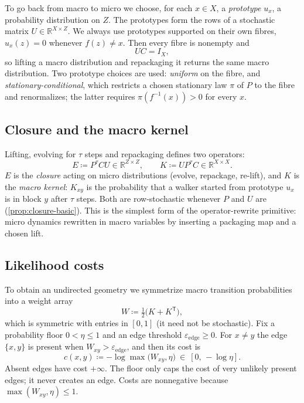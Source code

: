 \documentclass[11pt]{article}
\newcommand{\R}{\mathbb{R}}
\begin{document}
To go back from macro to micro we choose, for each $x\in X$, a \emph{prototype} $u_x$, a probability distribution on $Z$.
The prototypes form the rows of a stochastic matrix $U\in\R^{X\times Z}$.
We always use prototypes supported on their own fibres, $u_x(z)=0$ whenever $f(z)\neq x$.
Then every fibre is nonempty and
\begin{equation}
UC=I_X,
\label{eq:UC}
\end{equation}
so lifting a macro distribution and repackaging it returns the same macro distribution.
Two prototype choices are used: \emph{uniform} on the fibre, and \emph{stationary-conditional}, which restricts a chosen stationary law $\pi$ of $P$ to the fibre and renormalizes; the latter requires $\pi(f^{-1}(x))>0$ for every $x$.

\subsection{Closure and the macro kernel}

Lifting, evolving for $\tau$ steps and repackaging defines two operators:
\begin{equation}
E \coloneqq P^{\tau}CU \in\R^{Z\times Z},
\qquad
K \coloneqq UP^{\tau}C \in\R^{X\times X}.
\label{eq:closure-macro}
\end{equation}
$E$ is the \emph{closure} acting on micro distributions (evolve, repackage, re-lift), and $K$ is the \emph{macro kernel}: $K_{xy}$ is the probability that a walker started from prototype $u_x$ is in block $y$ after $\tau$ steps.
Both are row-stochastic whenever $P$ and $U$ are (\cref{prop:closure-basic}).
This is the simplest form of the operator-rewrite primitive: micro dynamics rewritten in macro variables by inserting a packaging map and a chosen lift.

\subsection{Likelihood costs}
\label{sec:costs}

To obtain an undirected geometry we symmetrize macro transition probabilities into a weight array
\begin{equation}
W\coloneqq \tfrac12\bigl(K+K^{\mathsf T}\bigr),
\end{equation}
which is symmetric with entries in $[0,1]$ (it need not be stochastic).
Fix a probability floor $0<\eta\le 1$ and an edge threshold $\varepsilon_{\mathrm{edge}}\ge 0$.
For $x\neq y$ the edge $\{x,y\}$ is present when $W_{xy}>\varepsilon_{\mathrm{edge}}$, and then its cost is
\begin{equation}
c(x,y)\coloneqq -\log\max\bigl(W_{xy},\eta\bigr)\ \in\ [0,\,-\log\eta].
\label{eq:cost}
\end{equation}
Absent edges have cost $+\infty$.
The floor only caps the cost of very unlikely present edges; it never creates an edge.
Costs are nonnegative because $\max(W_{xy},\eta)\le 1$.
\end{document}
